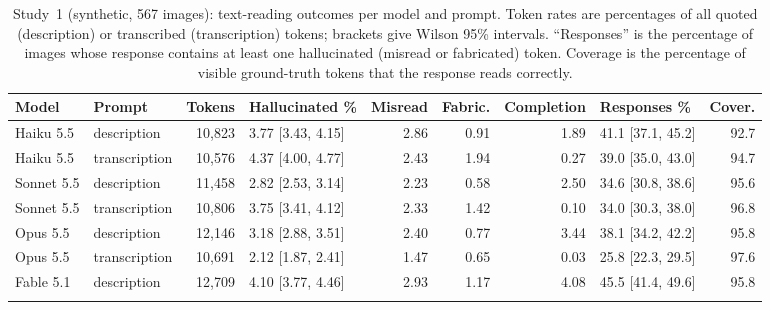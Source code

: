 \documentclass[pdflatex,sn-mathphys-num]{sn-jnl}%
\theoremstyle{thmstyleone}%
\theoremstyle{thmstyletwo}%
\theoremstyle{thmstylethree}%
\newcommand{\NImages}{567}
\begin{document}
\begin{table}[!htbp]
\caption{Study~1 (synthetic, \NImages{} images): text-reading outcomes per model and prompt. Token rates are percentages of all quoted (description) or transcribed (transcription) tokens; brackets give Wilson 95\% intervals. ``Responses'' is the percentage of images whose response contains at least one hallucinated (misread or fabricated) token. Coverage is the percentage of visible ground-truth tokens that the response reads correctly.}\label{tab:rates}
\footnotesize
\setlength{\tabcolsep}{3pt}
\begin{tabular*}{\textwidth}{@{\extracolsep\fill}llrlrrrlr}
\toprule
Model & Prompt & Tokens & Hallucinated \% & Misread & Fabric. & Completion & Responses \% & Cover. \\
\midrule
Haiku 5.5 & description & 10{,}823 & 3.77 [3.43{,} 4.15] & 2.86 & 0.91 & 1.89 & 41.1 [37.1{,} 45.2] & 92.7 \\
Haiku 5.5 & transcription & 10{,}576 & 4.37 [4.00{,} 4.77] & 2.43 & 1.94 & 0.27 & 39.0 [35.0{,} 43.0] & 94.7 \\
Sonnet 5.5 & description & 11{,}458 & 2.82 [2.53{,} 3.14] & 2.23 & 0.58 & 2.50 & 34.6 [30.8{,} 38.6] & 95.6 \\
Sonnet 5.5 & transcription & 10{,}806 & 3.75 [3.41{,} 4.12] & 2.33 & 1.42 & 0.10 & 34.0 [30.3{,} 38.0] & 96.8 \\
Opus 5.5 & description & 12{,}146 & 3.18 [2.88{,} 3.51] & 2.40 & 0.77 & 3.44 & 38.1 [34.2{,} 42.2] & 95.8 \\
Opus 5.5 & transcription & 10{,}691 & 2.12 [1.87{,} 2.41] & 1.47 & 0.65 & 0.03 & 25.8 [22.3{,} 29.5] & 97.6 \\
Fable 5.1 & description & 12{,}709 & 4.10 [3.77{,} 4.46] & 2.93 & 1.17 & 4.08 & 45.5 [41.4{,} 49.6] & 95.8 \\
\botrule
\end{tabular*}
\end{table}
\end{document}
